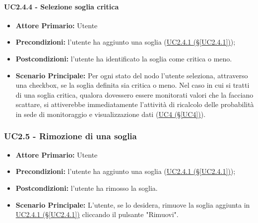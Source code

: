\paragraph{UC2.4.4 - Selezione soglia critica}\label{UC2.4.4}
\begin{itemize}
	\item \textbf{Attore Primario:} Utente
	\item \textbf{Precondizioni:} l'utente ha aggiunto una soglia (\hyperref[UC2.4.1]{UC2.4.1 (§\ref*{UC2.4.1})});
	\item \textbf{Postcondizioni:} l'utente ha identificato la soglia come critica o meno.
	\item \textbf{Scenario Principale:} Per ogni stato del nodo l'utente seleziona, attraverso una checkbox, se la soglia definita sia critica o meno. Nel caso in cui si tratti di una soglia critica, qualora dovessero essere monitorati valori che la facciano scattare, si attiverebbe immediatamente l'attività di ricalcolo delle probabilità in sede di monitoraggio e visualizzazione dati (\hyperref[UC4]{UC4 (§\ref*{UC4})}). 
\end{itemize}

\pagebreak

\subsubsection{UC2.5 - Rimozione di una soglia}\label{UC2.5}
\begin{itemize}
	\item \textbf{Attore Primario:} Utente
	\item \textbf{Precondizioni:} l'utente ha aggiunto una soglia (\hyperref[UC2.4.1]{UC2.4.1 (§\ref*{UC2.4.1})});
	\item \textbf{Postcondizioni:} l'utente ha rimosso la soglia.
	\item \textbf{Scenario Principale:} L'utente, se lo desidera, rimuove la soglia aggiunta in \hyperref[UC2.4.1]{UC2.4.1 (§\ref*{UC2.4.1})} cliccando il pulsante "Rimuovi". 
\end{itemize}

